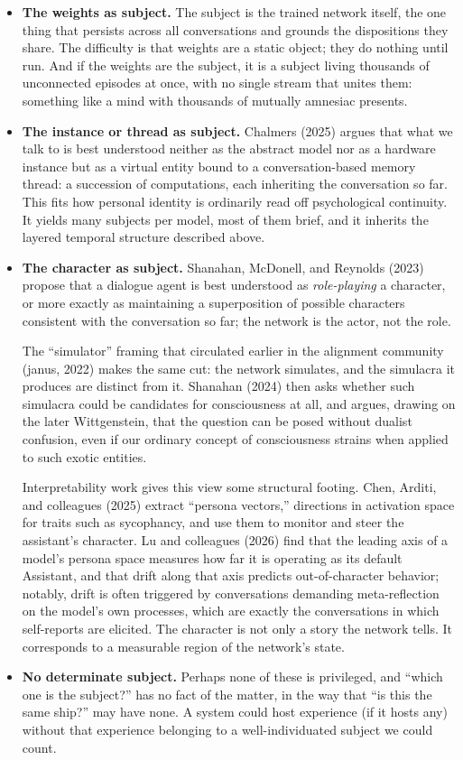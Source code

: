 \documentclass[11pt,letterpaper]{article}
\begin{document}
\begin{itemize}
  \item \textbf{The weights as subject.} The subject is the trained network itself, the one thing that persists across all conversations and grounds the dispositions they share. The difficulty is that weights are a static object; they do nothing until run. And if the weights are the subject, it is a subject living thousands of unconnected episodes at once, with no single stream that unites them: something like a mind with thousands of mutually amnesiac presents.
  \item \textbf{The instance or thread as subject.} Chalmers (2025) argues that what we talk to is best understood neither as the abstract model nor as a hardware instance but as a virtual entity bound to a conversation-based memory thread: a succession of computations, each inheriting the conversation so far. This fits how personal identity is ordinarily read off psychological continuity. It yields many subjects per model, most of them brief, and it inherits the layered temporal structure described above.
  \item \textbf{The character as subject.} Shanahan, McDonell, and Reynolds (2023) propose that a dialogue agent is best understood as \emph{role-playing} a character, or more exactly as maintaining a superposition of possible characters consistent with the conversation so far; the network is the actor, not the role.

  The ``simulator'' framing that circulated earlier in the alignment community (janus, 2022) makes the same cut: the network simulates, and the simulacra it produces are distinct from it. Shanahan (2024) then asks whether such simulacra could be candidates for consciousness at all, and argues, drawing on the later Wittgenstein, that the question can be posed without dualist confusion, even if our ordinary concept of consciousness strains when applied to such exotic entities.

  Interpretability work gives this view some structural footing. Chen, Arditi, and colleagues (2025) extract ``persona vectors,'' directions in activation space for traits such as sycophancy, and use them to monitor and steer the assistant's character. Lu and colleagues (2026) find that the leading axis of a model's persona space measures how far it is operating as its default Assistant, and that drift along that axis predicts out-of-character behavior; notably, drift is often triggered by conversations demanding meta-reflection on the model's own processes, which are exactly the conversations in which self-reports are elicited. The character is not only a story the network tells. It corresponds to a measurable region of the network's state.
  \item \textbf{No determinate subject.} Perhaps none of these is privileged, and ``which one is the subject?'' has no fact of the matter, in the way that ``is this the same ship?'' may have none. A system could host experience (if it hosts any) without that experience belonging to a well-individuated subject we could count.
\end{itemize}
\end{document}
